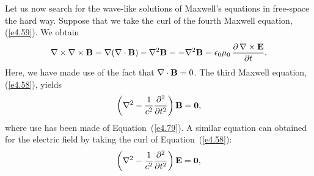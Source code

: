 Let us now   search for the wave-like solutions of Maxwell's equations in free-space the hard way.
Suppose that we take the curl of the fourth Maxwell equation, (\ref{e4.59}). We obtain
\begin{equation}
\nabla\times\nabla\times{\bf B} = \nabla(\nabla\cdot{\bf B}) - \nabla^2{\bf B}
= -\nabla^2 {\bf B} = \epsilon_0\mu_0\,\frac{\partial\, \nabla\times {\bf E}}{\partial t}.
\end{equation}
Here, we have made use of the fact that $\nabla\cdot{\bf B} = 0$. The third Maxwell equation,
(\ref{e4.58}), yields
\begin{equation}
\left( \nabla^2 - \frac{1}{c^2} \frac{\partial^2}{\partial t^2}\right) {\bf B} = {\bf 0},
\end{equation}
where use has been made of Equation~(\ref{e4.79}). A similar equation can obtained for the electric field
by taking the curl of Equation~(\ref{e4.58}):
\begin{equation}
\left( \nabla^2 - \frac{1}{c^2} \frac{\partial^2}{\partial t^2}\right) {\bf E} = {\bf 0},
\end{equation}

